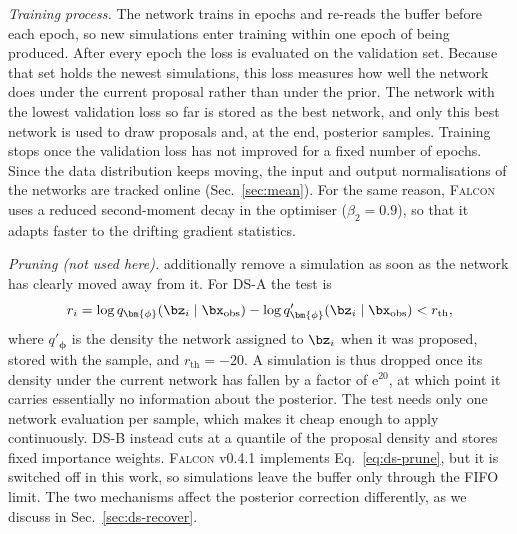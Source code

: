 \emph{Training process.} The network trains in epochs and re-reads the
buffer before each epoch, so new simulations enter training within one epoch
of being produced. After every epoch the loss is evaluated on the validation
set. Because that set holds the newest simulations, this loss measures how
well the network does under the current proposal rather than under the prior.
The network with the lowest validation loss so far is stored as the best
network, and only this best network is used to draw proposals and, at the
end, posterior samples. Training stops once the validation loss has not
improved for a fixed number of epochs. Since the data distribution keeps
moving, the input and output normalisations of the networks are tracked
online (Sec.~\ref{sec:mean}). For the same reason, \textsc{Falcon} uses a
reduced second-moment decay in the optimiser ($\beta_2=0.9$), so that it
adapts faster to the drifting gradient statistics.

\emph{Pruning (not used here).} \citet{lyu_dynamic_2026} additionally remove
a simulation as soon as the network has clearly moved away from it. For DS-A
the test is
\begin{equation}
    r_i=\log q_{\bm{\phi}}(\bz_i\mid\bx_{\mathrm{obs}})-\log q'_{\bm{\phi}}(\bz_i\mid\bx_{\mathrm{obs}})<r_{\mathrm{th}},
    \label{eq:ds-prune}
\end{equation}
where $q'_{\bm{\phi}}$ is the density the network assigned to $\bz_i$ when it
was proposed, stored with the sample, and $r_{\mathrm{th}}=-20$. A simulation
is thus dropped once its density under the current network has fallen by a
factor of $\mathrm{e}^{20}$, at which point it carries essentially no
information about the posterior. The test needs only one network evaluation
per sample, which makes it cheap enough to apply continuously. DS-B instead
cuts at a quantile of the proposal density and stores fixed importance
weights. \textsc{Falcon} v0.4.1 implements Eq.~\eqref{eq:ds-prune}, but it is
switched off in this work, so simulations leave the buffer only through the
FIFO limit. The two mechanisms affect the posterior correction differently,
as we discuss in Sec.~\ref{sec:ds-recover}.

